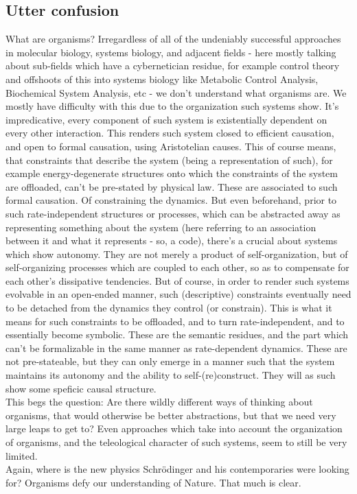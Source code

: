 \documentclass[a4paper,12pt,twoside,leqno]{article}
\begin{document}
\subsection*{Utter confusion}
What are organisms? Irregardless of all of the undeniably successful approaches in molecular biology, systems biology, and adjacent fields - here mostly talking about sub-fields which have a cybernetician residue, for example control theory and offshoots of this into systems biology like Metabolic Control Analysis, Biochemical System Analysis, etc - we don't understand what organisms are. We mostly have difficulty with this due to the organization such systems show. It's impredicative, every component of such system is existentially dependent on every other interaction. This renders such system closed to efficient causation, and open to formal causation, using Aristotelian causes. This of course means, that constraints that describe the system (being a representation of such), for example energy-degenerate structures onto which the constraints of the system are offloaded, can't be pre-stated by physical law. These are associated to such formal causation. Of constraining the dynamics. But even beforehand, prior to such rate-independent structures or processes, which can be abstracted away as representing something about the system (here referring to an association between it and what it represents - so, a code), there's a crucial about systems which show autonomy. They are not merely a product of self-organization, but of self-organizing processes which are coupled to each other, so as to compensate for each other's dissipative tendencies. But of course, in order to render such systems evolvable in an open-ended manner, such (descriptive) constraints eventually need to be detached from the dynamics they control (or constrain). This is what it means for such constraints to be offloaded, and to turn rate-independent, and to essentially become symbolic. These are the semantic residues, and the part which can't be formalizable in the same manner as rate-dependent dynamics. These are not pre-stateable, but they can only emerge in a manner such that the system maintains its autonomy and the ability to self-(re)construct. They will as such show some speficic causal structure.\\
This begs the question: Are there wildly different ways of thinking about organisms, that would otherwise be better abstractions, but that we need very large leaps to get to? Even approaches which take into account the organization of organisms, and the teleological character of such systems, seem to still be very limited.\\
Again, where is the new physics Schrödinger and his contemporaries were looking for? Organisms defy our understanding of Nature. That much is clear.
\end{document}
